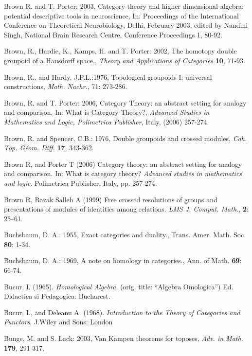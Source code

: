 \documentclass[12pt]{article}
\begin{document}
\begin{thebibliography}{399}
Brown R. and T. Porter: 2003, Category theory and higher
dimensional algebra: potential descriptive tools in neuroscience, In:
Proceedings of the International Conference on Theoretical
Neurobiology, Delhi, February 2003, edited by Nandini Singh,
National Brain Research Centre, Conference Proceedings 1, 80-92.

Brown, R., Hardie, K., Kamps, H. and T. Porter: 2002, The homotopy
double groupoid of a Hausdorff space., \emph{Theory and
Applications of Categories} \textbf{10}, 71-93.

Brown, R., and Hardy, J.P.L.:1976, Topological groupoids I:
universal constructions, \emph{Math. Nachr.}, 71: 273-286.

Brown, R. and T. Porter: 2006, Category Theory: an abstract
setting for analogy and comparison, In: What is Category Theory?,
\emph{Advanced Studies in Mathematics and Logic, Polimetrica
Publisher}, Italy, (2006) 257-274.

Brown, R. and Spencer, C.B.: 1976, Double groupoids and crossed
modules, \emph{Cah.  Top. G\'{e}om. Diff.} \textbf{17}, 343-362.

Brown R, and Porter T (2006) Category theory: an abstract setting for analogy and comparison. In: What is
category theory? {\em  Advanced studies in mathematics and logic}. Polimetrica Publisher, Italy, pp.
257-274.

Brown R, Razak Salleh A (1999) Free crossed resolutions of groups and presentations of modules of
identities among relations. {\em LMS J. Comput. Math.}, \textbf{2}: 25--61.

Buchsbaum, D. A.: 1955, Exact categories and duality., Trans. Amer. Math. Soc. \textbf{80}: 1-34.

Buchsbaum, D. A.: 1969, A note on homology in categories., Ann. of Math. \textbf{69}: 66-74.

Bucur, I. (1965). {\em Homological Algebra}. (orig. title: ``Algebra Omologica'')
Ed. Didactica si Pedagogica: Bucharest.

Bucur, I., and Deleanu A. (1968). {\em  Introduction to the Theory of Categories and Functors}. J.Wiley and Sons: London

Bunge, M. and S. Lack: 2003, Van Kampen theorems for toposes, \emph{Adv. in Math.} \textbf{179}, 291-317.


\end{thebibliography}
\end{document}
